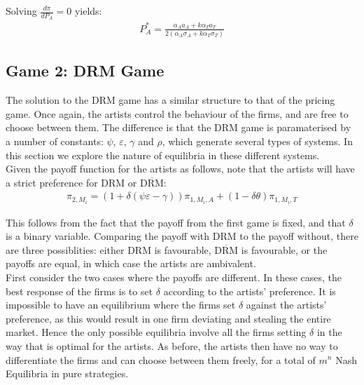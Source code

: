 \documentclass[a4paper,12pt]{article}
\numberwithin{equation}{section}
\newcommand{\drm}{\text{DRM}}
\newcommand{\nodrm}{\overline{\drm}}
\newcommand{\artistpayoff}[2]{\pi_{#1, M_{#2}}}
\newcommand{\artistalbum}[2]{\pi_{#1, M_{#2}, A}}
\newcommand{\artistticket}[2]{\pi_{#1, M_{#2}, T}}
\newcommand{\deriv}[2]{\frac{d #1}{d #2}}
\begin{document}
Solving $\deriv{\pi}{P_A} = 0$ yields:
\begin{eqnarray}
P_A^* = \frac{\alpha_A a_A + k \alpha_T a_T}{2(\alpha_A \sigma_A + k \alpha_T \sigma_T)}
\end{eqnarray}

\subsection{Game 2: DRM Game}

The solution to the DRM game has a similar structure to that of the pricing game. Once again, the artists control the behaviour of the firms, and are free to choose between them. The difference is that the DRM game is paramaterised by a number of constants: $\psi$, $\varepsilon$, $\gamma$ and $\rho$, which generate several types of systems. In this section we explore the nature of equilibria in these different systems.\\

Given the payoff function for the artists as follows, note that the artists will have a strict preference for DRM or $\overline{\text{DRM}}$:
\begin{eqnarray*}
\artistpayoff{2}{i} = (1 + \delta (\psi \varepsilon - \gamma)) \artistalbum{1}{i} + (1 - \delta \theta) \artistticket{1}{i}
\end{eqnarray*}

This follows from the fact that the payoff from the first game is fixed, and that $\delta$ is a binary variable. Comparing the payoff with DRM to the payoff without, there are three possiblities: either DRM is favourable, $\nodrm$ is favourable, or the payoffs are equal, in which case the artists are ambivalent.\\

First consider the two cases where the payoffs are different. In these cases, the best response of the firms is to set $\delta$ according to the artists' preference. It is impossible to have an equilibrium where the firms set $\delta$ against the artists' preference, as this would result in one firm deviating and stealing the entire market. Hence the only possible equilibria involve all the firms setting $\delta$ in the way that is optimal for the artists. As before, the artists then have no way to differentiate the firms and can choose between them freely, for a total of $m^n$ Nash Equilibria in pure strategies.\\
\end{document}
